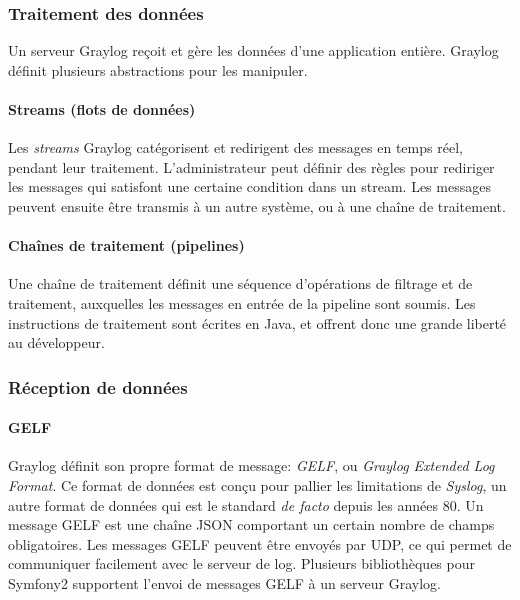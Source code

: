             \subsubsection{Traitement des données}
                
                Un serveur Graylog reçoit et gère les données d'une application entière. Graylog définit plusieurs abstractions pour les manipuler.
                
                \paragraph{Streams (flots de données)} 
                    Les \emph{streams} Graylog catégorisent et redirigent des messages en temps réel, pendant leur traitement. L'administrateur peut définir des règles pour rediriger les messages qui satisfont une certaine condition dans un stream. Les messages peuvent ensuite être transmis à un autre système, ou à une chaîne de traitement.

                \paragraph{Chaînes de traitement (pipelines)}
                    Une chaîne de traitement définit une séquence d'opérations de filtrage et de traitement, auxquelles les messages en entrée de la pipeline sont soumis. Les instructions de traitement sont écrites en Java, et offrent donc une grande liberté au développeur.


            \subsubsection{Réception de données}

                \paragraph{GELF}
                    Graylog définit son propre format de message: \emph{GELF}, ou \emph{Graylog Extended Log Format}. Ce format de données est conçu pour pallier les limitations de \emph{Syslog}, un autre format de données qui est le standard \emph{de facto} depuis les années 80. Un message GELF est une chaîne JSON comportant un certain nombre de champs obligatoires. Les messages GELF peuvent être envoyés par UDP, ce qui permet de communiquer facilement avec le serveur de log. Plusieurs bibliothèques pour Symfony2 supportent l'envoi de messages GELF à un serveur Graylog.

